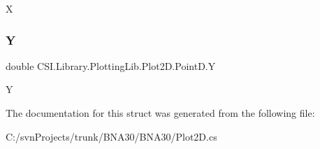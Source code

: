 X 

\mbox{\label{struct_c_s_i_1_1_library_1_1_plotting_lib_1_1_plot2_d_1_1_point_d_af42801968d615d901d55db3851d6597a}} 
\subsubsection{\texorpdfstring{Y}{Y}}
{\footnotesize\ttfamily double C\+S\+I.\+Library.\+Plotting\+Lib.\+Plot2\+D.\+Point\+D.\+Y}



Y 



The documentation for this struct was generated from the following file\+:\begin{DoxyCompactItemize}
\item 
C\+:/svn\+Projects/trunk/\+B\+N\+A30/\+B\+N\+A30/Plot2\+D.\+cs\end{DoxyCompactItemize}
